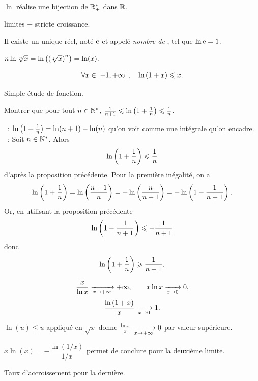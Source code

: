 \documentclass{magnoliaold}
\begin{document}
\begin{proposition}[utile=-3]
$\ln$ réalise une bijection de $\mathbb{R}_+^*$ dans $\mathbb{R}$.
\end{proposition}

\begin{preuve}
limites + stricte croissance.
\end{preuve}

\begin{definition}[utile=-3]
Il existe un unique réel, noté ${\rm e}$ et appelé \emph{nombre de }, tel que $\ln {\rm e}=1$.
\end{definition}



\begin{preuve}
$n\ln\sqrt[n]{x}=\ln\left(\left(\sqrt[n]{x}\right)^{n}\right)=\ln(x)$.
\end{preuve}


\begin{proposition}[utile=-3]
\[\forall x\in\left]-1,+\infty\right[ ,\quad \ln\left(1+x\right)\leqslant x.\]  
\end{proposition}

\begin{preuve}
Simple étude de fonction.
\end{preuve}


\begin{exoUnique}
\exemple Montrer que pour tout $n\in{\mathbb{N}^*}$,
  $\frac{1}{n+1}\leqslant\ln\left(1+\frac{1}{n}\right)\leqslant\frac{1}{n}$.
\end{exoUnique}

\begin{sol}
~: $\ln\left(1+\frac{1}{n}\right)=\ln(n+1)-\ln(n)$ qu'on voit comme une intégrale qu'on encadre.\\
~: Soit $n\in{\mathbb{N}^*}$. Alors
\[\ln\left(1+\frac{1}{n}\right)\leqslant\frac{1}{n}\]
d'après la proposition précédente. Pour la première inégalité, on a
\[\ln\left(1+\frac{1}{n}\right)=\ln\left(\frac{n+1}{n}\right)=-\ln\left(\frac{n}{n+1}\right)=-\ln\left(1-\frac{1}{n+1}\right).\]
Or, en utilisant la proposition précédente
\[\ln\left(1-\frac{1}{n+1}\right)\leqslant -\frac{1}{n+1}\]
donc
\[\ln\left(1+\frac{1}{n}\right)\geqslant\frac{1}{n+1}.\]
\end{sol}

\begin{proposition}[utile=-3]
\[\frac{x}{\ln x}\xrightarrow[x\rightarrow +\infty]{} +\infty, \qquad
  x\ln x\xrightarrow[x\rightarrow 0]{} 0,\]
\[\frac{\ln\left(1+x\right)}{x} \xrightarrow[x\rightarrow 0]{} 1.\]  
\end{proposition}

\begin{preuve}
$\ln(u)\leq u$ appliqué en $\sqrt{x}$ donne $\frac{\ln x}{x}\xrightarrow[x\rightarrow +\infty]{} 0$ par valeur supérieure.

$x\ln(x)=-\dfrac{\ln(1/x)}{1/x}$ permet de conclure pour la deuxième limite.

Taux d'accroissement pour la dernière.

\end{preuve}
\end{document}

